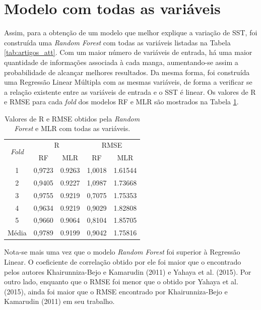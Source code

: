 \section{Modelo com todas as variáveis}

Assim, para a obtenção de um modelo que melhor explique a variação de SST, foi construída uma \textit{Random Forest} com todas as variáveis listadas na Tabela \ref{tab:artigos_att}. Com um maior número de variáveis de entrada, há uma maior quantidade de informações associada à cada manga, aumentando-se assim a probabilidade de alcançar melhores resultados. Da mesma forma, foi construída uma Regressão Linear Múltipla com as mesmas variáveis, de forma a verificar se a relação existente entre as variáveis de entrada e o SST é linear. Os valores de R e RMSE para cada \textit{fold} dos modelos RF e MLR são mostrados na Tabela \ref{tbl:r_rmse_all}.

\begin{table}[H]
	\centering
	\caption{\label{tbl:r_rmse_all} Valores de R e RMSE obtidos pela \textit{Random Forest} e MLR com todas as variáveis.}
	\begin{tabular}{ccccc}
	\hline
	\multirow{2}{*}{\textit{Fold}} & \multicolumn{2}{c}{R} & \multicolumn{2}{c}{RMSE} \\ \cline{2-5}
	  	  & RF      & MLR    & RF 	  & MLR \\ \hline
	1     & 0,9723  & 0.9263 & 1,0018 & 1.61544 \\ \hline
	2     & 0,9405  & 0.9227 & 1,0987 & 1.73668 \\ \hline
	3     & 0,9755  & 0.9219 & 0,7075 & 1.75353 \\ \hline
	4     & 0,9634  & 0.9219 & 0,9029 & 1.82808 \\ \hline
	5     & 0,9660  & 0.9064 & 0,8104 & 1.85705 \\ \hline
	Média & 0,9789 	& 0.9199 & 0,9042 & 1.75816 \\ \hline
	\end{tabular}
\end{table}

Nota-se mais uma vez que o modelo \textit{Random Forest} foi superior à Regressão Linear. O coeficiente de correlação obtido por ele foi maior que o encontrado pelos autores Khairunniza-Bejo e Kamarudin (2011) e Yahaya et al. (2015). Por outro lado, enquanto que o RMSE foi menor que o obtido por Yahaya et al. (2015), ainda foi maior que o RMSE encontrado por Khairunniza-Bejo e Kamarudin (2011) em seu trabalho.

